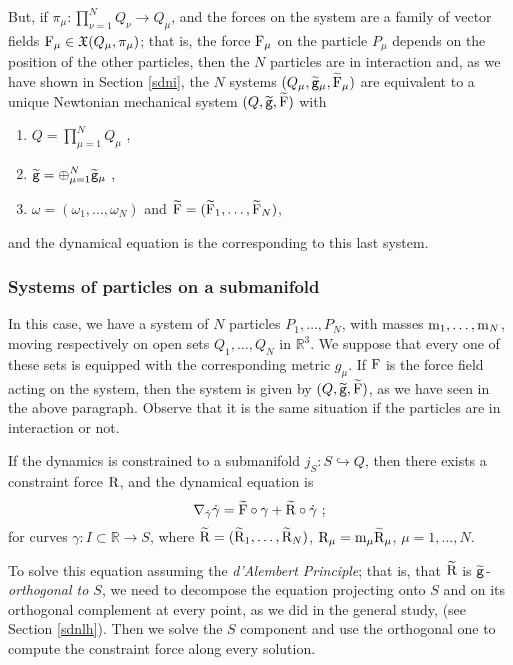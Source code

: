\documentclass[12pt]{report}
\def\ben{\begin{enumerate}}
\def\een{\end{enumerate}}
\def\dst{\displaystyle}
\def\moment#1#2#3{{#1}_{#2}, \ldots, {#1}_{#3}}
\def\vf{\mathfrak X}
\def\Real{\mathbb{R}}
\begin{document}
But, if  $\pi_\mu\colon \prod_{\nu=1}^N Q_\nu\to Q_\mu$,
and the forces on the system are a family of vector fields ${\rm F}_\mu\in\vf (Q_\mu,\pi_\mu)$;
 that is, the force ${\rm F}_\mu$ on the particle $P_\mu$ depends on the position of the other particles, then the $N$ particles are in interaction and,
as we have shown in Section  \ref{sdni}, the $N$ systems
$(Q_\mu,\widetilde{\tt g}_\mu,\widetilde{\rm F}_\mu)$ are equivalent to a unique Newtonian mechanical system $(Q,\widetilde{\tt g},\widetilde{\rm F})$ with
\ben
\item
\(\dst Q=\prod_{\mu=1}^NQ_\mu\) ,
\item
\(\dst\widetilde {\tt g}=\oplus_{\mu=1}^N\widetilde{\tt g}_\mu\) ,
\item
$\omega=(\omega_1,\ldots ,\omega_N)$ and
$\widetilde{\rm F}=(\widetilde{\rm F}_1,\ldots ,\widetilde{\rm F}_N)$,
\een
and the dynamical equation is the corresponding to this last system.

\subsubsection{Systems of particles on a submanifold}

In this case, we have a system of $N$ particles $\moment{P}{1}{N}$,
with masses $\moment{{\rm m}}{1}{N}$, moving respectively on open sets $\moment{Q}{1}{N}$ in $\Real^3$. We suppose that every one of these sets is equipped with the corresponding metric $g_\mu$.
If ${\rm F}$ is the force field acting on the system, then the system is given by $(Q,\widetilde{\tt g},\widetilde{\rm F})$,
as we have seen in the above paragraph. Observe that it is the same situation if the particles are in interaction or not.

If the dynamics is constrained to a submanifold
$j_S\colon S\hookrightarrow Q$, then there exists a constraint force ${\rm R}$,
and the dynamical equation is
$$
\nabla_{\dot\gamma}\dot\gamma=\widetilde{\rm F}\circ\gamma +\widetilde{\rm R}\circ\dot\gamma \ ;
$$
for curves $\gamma\colon I\subset\Real\to S$, where 
$\widetilde{\rm R}=(\widetilde{\rm R}_1,\ldots,\widetilde{\rm R}_N)$, ${\rm R}_{\mu}=
{\rm m}_{\mu}\widetilde{\rm R}_\mu$, $\mu=1,\ldots,N$.

To solve this equation assuming the \textsl{d'Alembert Principle};
that is, that $\widetilde{\rm R}$ is {\it $\widetilde{\tt g}$-orthogonal to $S$},
we need to decompose the equation projecting onto $S$ and on its orthogonal complement at every point, as we did in the general study, (see Section \ref{sdnlh}). Then we solve the $S$ component and use the orthogonal one to compute the constraint force along every solution.
\end{document}
